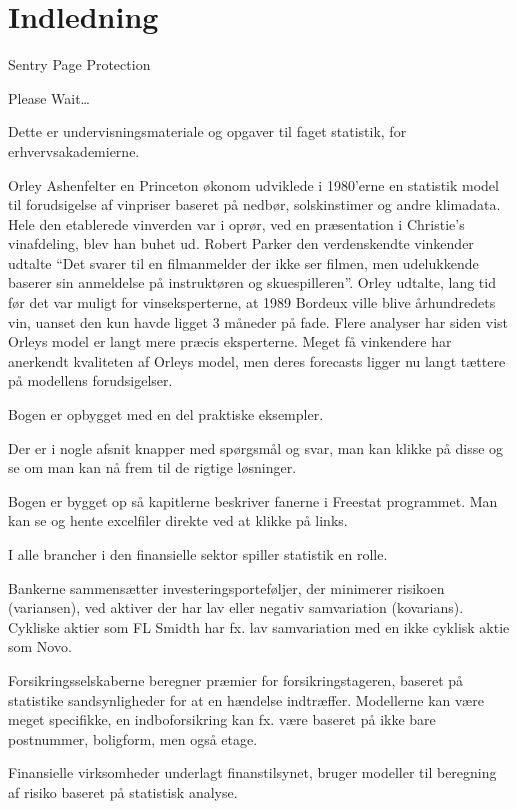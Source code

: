 \documentclass[]{book}
\begin{document}
\hypertarget{indledning}{%
\chapter{Indledning}\label{indledning}}

\hypertarget{Sentry_noJS}{}
Sentry Page Protection

\hypertarget{Sentry_redirecting}{}
Please Wait\ldots{}

Dette er undervisningsmateriale og opgaver til faget statistik, for erhvervsakademierne.

Orley Ashenfelter en Princeton økonom udviklede i 1980'erne en statistik model til forudsigelse af vinpriser baseret på nedbør, solskinstimer og andre klimadata. Hele den etablerede vinverden var i oprør, ved en præsentation i Christie's vinafdeling, blev han buhet ud. Robert Parker den verdenskendte vinkender udtalte ``Det svarer til en filmanmelder der ikke ser filmen, men udelukkende baserer sin anmeldelse på instruktøren og skuespilleren''. Orley udtalte, lang tid før det var muligt for vinseksperterne, at 1989 Bordeux ville blive århundredets vin, uanset den kun havde ligget 3 måneder på fade. Flere analyser har siden vist Orleys model er langt mere præcis eksperterne. Meget få vinkendere har anerkendt kvaliteten af Orleys model, men deres forecasts ligger nu langt tættere på modellens forudsigelser.

Bogen er opbygget med en del praktiske eksempler.

Der er i nogle afsnit knapper med spørgsmål og svar, man kan klikke på disse og se om man kan nå frem til de rigtige løsninger.

Bogen er bygget op så kapitlerne beskriver fanerne i Freestat programmet. Man kan se og hente excelfiler direkte ved at klikke på links.

I alle brancher i den finansielle sektor spiller statistik en rolle.

Bankerne sammensætter investeringsporteføljer, der minimerer risikoen (variansen), ved aktiver der har lav eller negativ samvariation (kovarians). Cykliske aktier som FL Smidth har fx. lav samvariation med en ikke cyklisk aktie som Novo.

Forsikringsselskaberne beregner præmier for forsikringstageren, baseret på statistike sandsynligheder for at en hændelse indtræffer. Modellerne kan være meget specifikke, en indboforsikring kan fx. være baseret på ikke bare postnummer, boligform, men også etage.

Finansielle virksomheder underlagt finanstilsynet, bruger modeller til beregning af risiko baseret på statistisk analyse.
\end{document}
